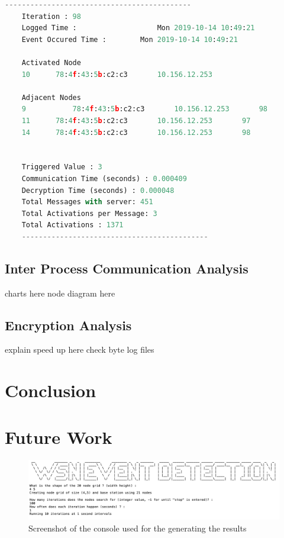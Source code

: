 \documentclass[conference]{IEEEtran}
\begin{document}
	\begin{lstlisting}[caption={Base station log file},label={lst:log},language=Python]
	--------------------------------------------
	Iteration : 98
	Logged Time : 					Mon 2019-10-14 10:49:21
	Event Occured Time : 		Mon 2019-10-14 10:49:21
	
	Activated Node
	10		78:4f:43:5b:c2:c3		10.156.12.253
	
	Adjacent Nodes
	9			78:4f:43:5b:c2:c3		10.156.12.253		98
	11		78:4f:43:5b:c2:c3		10.156.12.253		97
	14		78:4f:43:5b:c2:c3		10.156.12.253		98
	
	
	Triggered Value : 3
	Communication Time (seconds) : 0.000409
	Decryption Time (seconds) : 0.000048
	Total Messages with server: 451
	Total Activations per Message: 3
	Total Activations : 1371
	--------------------------------------------
	\end{lstlisting}
	
	

	

	


	\subsection{Inter Process Communication Analysis}
	
	charts here
	node diagram here

	\subsection{Encryption Analysis}	\label{encry}
	
	explain speed up here
	check byte log files
	
	

	\section{Conclusion}
	
	\section{Future Work}
	

	



	\newpage
	\onecolumn
	\appendix
	
	
\begin{figure}[h]
	\centering
	\includegraphics[width=6in,keepaspectratio]{console1}
	\caption{Screenshot of the console used for the generating the results}
	\label{screen 1}
\end{figure}
\end{document}
